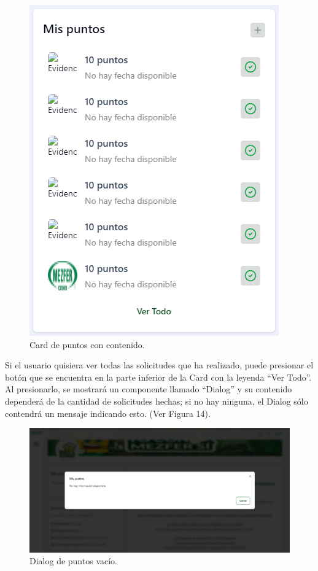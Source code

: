     \begin{figure}[H]
        \begin{center}
            \includegraphics[scale=0.60]{img/actividades/detalles-campanias/card-puntos-contenido.png}
            \caption{Card de puntos con contenido.}
            \label{fig:card-puntos-contenido}
        \end{center}
    \end{figure}

Si el usuario quisiera ver todas las solicitudes que ha realizado, puede presionar el botón que se encuentra en la parte inferior de la Card con la leyenda ``Ver Todo''. Al presionarlo, se mostrará un componente llamado ``Dialog'' y su contenido dependerá de la cantidad de solicitudes hechas; si no hay ninguna, el Dialog sólo contendrá un mensaje indicando esto. (Ver Figura 14).

    \begin{figure}[H]
        \begin{center}
            \includegraphics[scale=0.35]{img/actividades/detalles-campanias/dialog-puntos-vacio.png}
            \caption{Dialog de puntos vacío.}
            \label{fig:dialog-puntos-vacio}
        \end{center}
    \end{figure}

